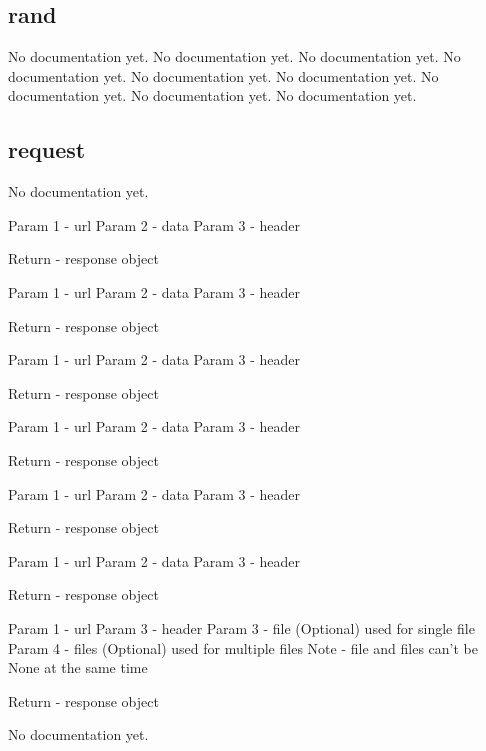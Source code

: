 \subsection{rand}
\par
No documentation yet.
{No documentation yet.}
{No documentation yet.}
{No documentation yet.}
{No documentation yet.}
{No documentation yet.}
{No documentation yet.}
{No documentation yet.}
{No documentation yet.}
\subsection{request}
\par
No documentation yet.
{Param 1 - url
Param 2 - data
Param 3 - header

Return - response object}
{Param 1 - url
Param 2 - data
Param 3 - header

Return - response object}
{Param 1 - url
Param 2 - data
Param 3 - header

Return - response object}
{Param 1 - url
Param 2 - data
Param 3 - header

Return - response object}
{Param 1 - url
Param 2 - data
Param 3 - header

Return - response object}
{Param 1 - url
Param 2 - data
Param 3 - header

Return - response object}
{Param 1 - url
Param 3 - header
Param 3 - file (Optional) used for single file
Param 4 - files (Optional) used for multiple files
Note - file and files can't be None at the same time

Return - response object}
{No documentation yet.}

